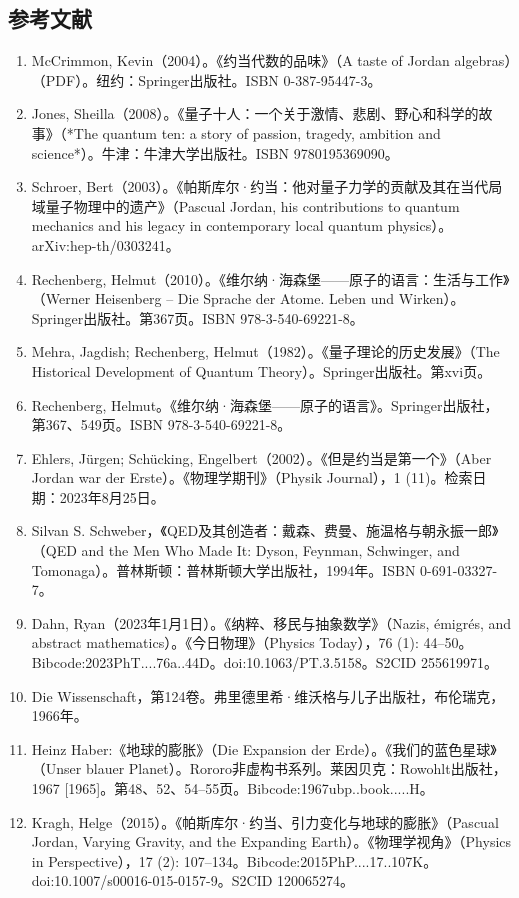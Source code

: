 \subsection{参考文献}
\begin{enumerate}
\item McCrimmon, Kevin（2004）。《约当代数的品味》（A taste of Jordan algebras）（PDF）。纽约：Springer出版社。ISBN 0-387-95447-3。
\item Jones, Sheilla（2008）。《量子十人：一个关于激情、悲剧、野心和科学的故事》（*The quantum ten: a story of passion, tragedy, ambition and science*）。牛津：牛津大学出版社。ISBN 9780195369090。
\item Schroer, Bert（2003）。《帕斯库尔·约当：他对量子力学的贡献及其在当代局域量子物理中的遗产》（Pascual Jordan, his contributions to quantum mechanics and his legacy in contemporary local quantum physics）。arXiv:hep-th/0303241。
\item Rechenberg, Helmut（2010）。《维尔纳·海森堡——原子的语言：生活与工作》（Werner Heisenberg – Die Sprache der Atome. Leben und Wirken）。Springer出版社。第367页。ISBN 978-3-540-69221-8。
\item Mehra, Jagdish; Rechenberg, Helmut（1982）。《量子理论的历史发展》（The Historical Development of Quantum Theory）。Springer出版社。第xvi页。
\item Rechenberg, Helmut。《维尔纳·海森堡——原子的语言》。Springer出版社，第367、549页。ISBN 978-3-540-69221-8。
\item Ehlers, Jürgen; Schücking, Engelbert（2002）。《但是约当是第一个》（Aber Jordan war der Erste）。《物理学期刊》（Physik Journal），1 (11)。检索日期：2023年8月25日。
\item Silvan S. Schweber，《QED及其创造者：戴森、费曼、施温格与朝永振一郎》（QED and the Men Who Made It: Dyson, Feynman, Schwinger, and Tomonaga）。普林斯顿：普林斯顿大学出版社，1994年。ISBN 0-691-03327-7。
\item Dahn, Ryan（2023年1月1日）。《纳粹、移民与抽象数学》（Nazis, émigrés, and abstract mathematics）。《今日物理》（Physics Today），76 (1): 44–50。Bibcode:2023PhT....76a..44D。doi:10.1063/PT.3.5158。S2CID 255619971。
\item Die Wissenschaft，第124卷。弗里德里希·维沃格与儿子出版社，布伦瑞克，1966年。
\item Heinz Haber:《地球的膨胀》（Die Expansion der Erde）。《我们的蓝色星球》（Unser blauer Planet）。Rororo非虚构书系列。莱因贝克：Rowohlt出版社，1967 [1965]。第48、52、54–55页。Bibcode:1967ubp..book.....H。
\item Kragh, Helge（2015）。《帕斯库尔·约当、引力变化与地球的膨胀》（Pascual Jordan, Varying Gravity, and the Expanding Earth）。《物理学视角》（Physics in Perspective），17 (2): 107–134。Bibcode:2015PhP....17..107K。doi:10.1007/s00016-015-0157-9。S2CID 120065274。

\end{enumerate}

